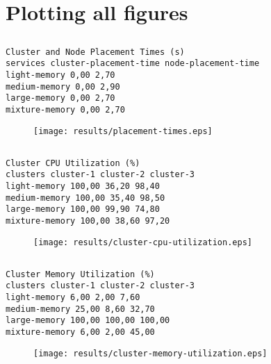 \documentclass{elsart}
\begin{document}
\section{Plotting all figures}
\subsection{}

\begin{lstlisting}[caption={}]
Cluster and Node Placement Times (s)
services cluster-placement-time node-placement-time
light-memory 0,00 2,70
medium-memory 0,00 2,90
large-memory 0,00 2,70
mixture-memory 0,00 2,70
\end{lstlisting}

\begin{figure}[ht]
\centering
\texttt{[image: results/placement-times.eps]}
\caption{}\label{fig:placement-times.eps}
\end{figure}

\subsection{}

\begin{lstlisting}[caption={}]
Cluster CPU Utilization (%)
clusters cluster-1 cluster-2 cluster-3
light-memory 100,00 36,20 98,40
medium-memory 100,00 35,40 98,50
large-memory 100,00 99,90 74,80
mixture-memory 100,00 38,60 97,20
\end{lstlisting}

\begin{figure}[ht]
\centering
\texttt{[image: results/cluster-cpu-utilization.eps]}
\caption{}\label{fig:cluster-cpu-utilization.eps}
\end{figure}

\subsection{}

\begin{lstlisting}[caption={}]
Cluster Memory Utilization (%)
clusters cluster-1 cluster-2 cluster-3
light-memory 6,00 2,00 7,60
medium-memory 25,00 8,60 32,70
large-memory 100,00 100,00 100,00
mixture-memory 6,00 2,00 45,00
\end{lstlisting}

\begin{figure}[ht]
\centering
\texttt{[image: results/cluster-memory-utilization.eps]}
\caption{}\label{fig:cluster-memory-utilization.eps}
\end{figure}
\end{document}
